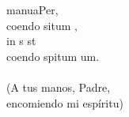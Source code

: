 \begin{cancion}%
	 manuaPer,\\
	coendo situm ,\\
	in s st \\
	coendo spitum um.\\
	\jump\\
(A tus manos, Padre, \\
 encomiendo mi espíritu)\\
\end{cancion}%
